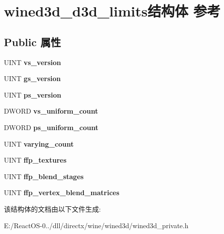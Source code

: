 \hypertarget{structwined3d__d3d__limits}{}\section{wined3d\+\_\+d3d\+\_\+limits结构体 参考}
\label{structwined3d__d3d__limits}
\subsection*{Public 属性}
\begin{DoxyCompactItemize}
\item 
\mbox{\label{structwined3d__d3d__limits_ad05069f6f212b76dfd13f0a98fff27e6}} 
U\+I\+NT {\bfseries vs\+\_\+version}
\item 
\mbox{\label{structwined3d__d3d__limits_a90aa1dcffc0a54e9fca2a0bb3b045275}} 
U\+I\+NT {\bfseries gs\+\_\+version}
\item 
\mbox{\label{structwined3d__d3d__limits_aa27223bceb283e64fd2c44e0e168eac0}} 
U\+I\+NT {\bfseries ps\+\_\+version}
\item 
\mbox{\label{structwined3d__d3d__limits_a7da6960565898703f1d0190c6b901df4}} 
D\+W\+O\+RD {\bfseries vs\+\_\+uniform\+\_\+count}
\item 
\mbox{\label{structwined3d__d3d__limits_a4ee819079ea3150805668c8658ec7a41}} 
D\+W\+O\+RD {\bfseries ps\+\_\+uniform\+\_\+count}
\item 
\mbox{\label{structwined3d__d3d__limits_a214b273a21283c969a1ad10b919a8ea5}} 
U\+I\+NT {\bfseries varying\+\_\+count}
\item 
\mbox{\label{structwined3d__d3d__limits_a1bc0e46a385e978623bc54613a75b491}} 
U\+I\+NT {\bfseries ffp\+\_\+textures}
\item 
\mbox{\label{structwined3d__d3d__limits_a600949af529395ec3d84ce2e5b0533e7}} 
U\+I\+NT {\bfseries ffp\+\_\+blend\+\_\+stages}
\item 
\mbox{\label{structwined3d__d3d__limits_a94ed7a9f9bcb002804eff45b78f5a44d}} 
U\+I\+NT {\bfseries ffp\+\_\+vertex\+\_\+blend\+\_\+matrices}
\end{DoxyCompactItemize}


该结构体的文档由以下文件生成\+:\begin{DoxyCompactItemize}
\item 
E\+:/\+React\+O\+S-\/0../dll/directx/wine/wined3d/wined3d\+\_\+private.\+h\end{DoxyCompactItemize}
